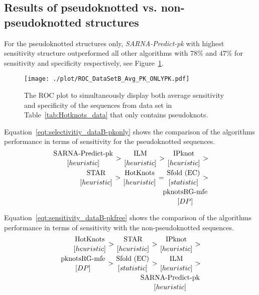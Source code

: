 \documentclass{doublecol-new}
\theoremstyle{TH}{
\newtheorem{lemma}{Lemma}
\newtheorem{theorem}[lemma]{Theorem}
\newtheorem{corrolary}[lemma]{Corrolary}
\newtheorem{conjecture}[lemma]{Conjecture}
\newtheorem{proposition}[lemma]{Proposition}
\newtheorem{claim}[lemma]{Claim}
\newtheorem{stheorem}[lemma]{Wrong Theorem}
\newtheorem{algorithm}{Algorithm}
}
\theoremstyle{THrm}{
\newtheorem{definition}{Definition}
\newtheorem{question}{Question}
\newtheorem{remark}{Remark}
\newtheorem{scheme}{Scheme}
}
\theoremstyle{THhit}{
\newtheorem{case}{Case}[section]
}
\begin{document}
\subsection{Results of pseudoknotted vs. non-pseudoknotted structures}
For the pseudoknotted structures only, {\em SARNA-Predict-pk} with highest sensitivity
structure outperformed all other
algorithms with $78\%$ and $47\%$ for sensitivity and specificity respectively, see
Figure~\ref{fig:ROC_DataSetB_PK_ONLYPK}.
\begin{figure}[t]
   \begin{center}
   \texttt{[image: ./plot/ROC\_DataSetB\_Avg\_PK\_ONLYPK.pdf]}
      \caption{The ROC plot to simultaneously display both
        average sensitivity and specificity of the sequences from data set in Table~\ref{tab:Hotknots_data} 
        that only contains pseudoknots.\label{fig:ROC_DataSetB_PK_ONLYPK}}
   \end{center}
\end{figure}

Equation~\ref{eqt:selectivitiy_dataB-pkonly} shows the
comparison of the algorithms performance in terms of sensitivity for the pseudoknotted sequences.
\begin{eqnarray}
\label{eqt:selectivitiy_dataB-pkonly}
{\mbox{SARNA-Predict-pk} \atop [heuristic]} > 
{\mbox{ILM} \atop [heuristic]} >  
{\mbox{IPknot} \atop [heuristic]} >   \\ \nonumber 
{\mbox{STAR} \atop [heuristic]} > 
{\mbox{HotKnots} \atop [heuristic]} = {\mbox{Sfold (EC)} \atop [statistic]} > \\ \nonumber 
{\mbox{pknotsRG-mfe}  \atop[DP]}
\end{eqnarray}

\noindent Equation~\ref{eqt:sensitivity_dataB-pkfree} shows
the comparison of the algorithms performance in terms of sensitivity with the non-pseudoknotted sequences.
\begin{eqnarray}
\label{eqt:sensitivity_dataB-pkfree}
{\mbox{HotKnots} \atop [heuristic]} > {\mbox{STAR} \atop [heuristic]} > {\mbox{IPknot} \atop [heuristic]} > \\ \nonumber 
{\mbox{pknotsRG-mfe}  \atop[DP]} > 
{\mbox{Sfold (EC)} \atop [statistic]} >
{\mbox{ILM} \atop [heuristic]} > \\ \nonumber 
{\mbox{SARNA-Predict-pk} \atop [heuristic]}
\end{eqnarray}
\end{document}
